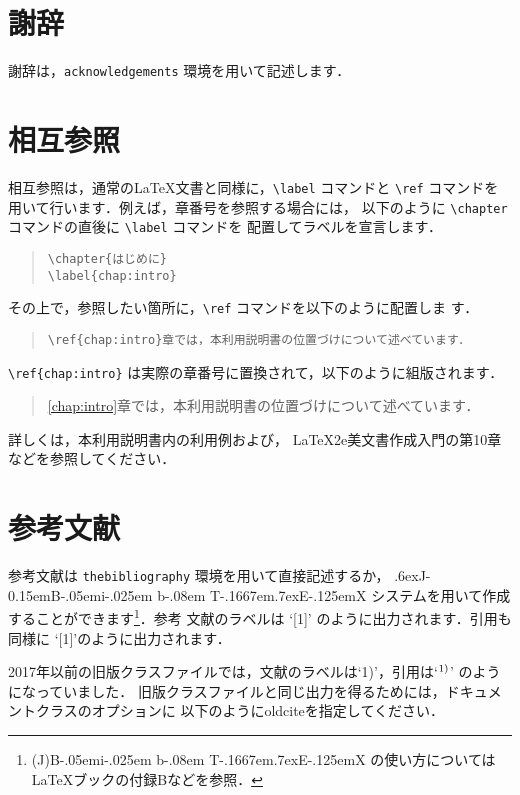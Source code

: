 \documentclass[sotsuron]{kuee}
\def\BibTeX{{\rm B\kern-.05em{\sc i\kern-.025em b}\kern-.08em
    T\kern-.1667em\lower.7ex\hbox{E}\kern-.125emX}}
\def\JBibTeX{\leavevmode\lower .6ex\hbox{J}\kern-0.15em\BibTeX}
\begin{document}
\section{謝辞}
謝辞は，\verb+acknowledgements+ 環境を用いて記述します．

\section{相互参照}
\label{cross_reference}
相互参照は，通常の\LaTeX{}文書と同様に，\verb+\label+ コマンドと
\verb+\ref+ コマンドを用いて行います．例えば，章番号を参照する場合には，
以下のように \verb+\chapter+ コマンドの直後に \verb+\label+ コマンドを
配置してラベルを宣言します．
\begin{quote}
\begin{verbatim}
\chapter{はじめに}
\label{chap:intro}
\end{verbatim}
\end{quote}
その上で，参照したい箇所に，\verb+\ref+ コマンドを以下のように配置しま
す．
\begin{quote}
\begin{verbatim}
\ref{chap:intro}章では，本利用説明書の位置づけについて述べています．
\end{verbatim}
\end{quote}
\verb+\ref{chap:intro}+ は実際の章番号に置換されて，以下のように組版されます．
\begin{quote}
\ref{chap:intro}章では，本利用説明書の位置づけについて述べています．
\end{quote}
詳しくは，本利用説明書内の利用例および，
\LaTeX2e{}美文書作成入門\cite{GuideBook}の第10章などを参照してください．


\section{参考文献}
参考文献は \verb+thebibliography+ 環境を用いて直接記述するか，
\JBibTeX{} システムを用いて作成することができます\footnote{(J)\BibTeX 
の使い方については \LaTeX ブック\cite{LaTeX}の付録Bなどを参照．}．参考
文献のラベルは `[1]' のように出力されます．引用も同様に
`[1]'のように出力されます．

2017年以前の旧版クラスファイルでは，文献のラベルは`1)'，引用は`$^{\mbox{\scriptsize 1)}}$'
のようになっていました．
旧版クラスファイルと同じ出力を得るためには，ドキュメントクラスのオプションに
以下のように{\ttfamily oldcite}を指定してください．
\end{document}
